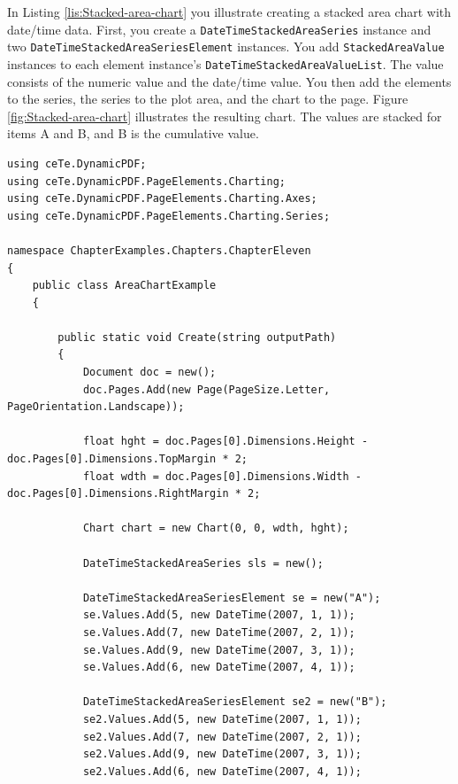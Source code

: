 \documentclass[american,letterpaper]{tufte-book}
\numberwithin{equation}{section}
\numberwithin{figure}{section}
\begin{document}
{In Listing \ref{lis:Stacked-area-chart} you illustrate creating a
stacked area chart with date/time data. First, you create a \texttt{DateTimeStackedAreaSeries}
instance and two \texttt{DateTimeStackedAreaSeriesElement} instances.
You add \texttt{StackedAreaValue} instances to each element instance’s
\texttt{DateTimeStackedAreaValueList}. The value consists of the numeric
value and the date/time value. You then add the elements to the series,
the series to the plot area, and the chart to the page. Figure \ref{fig:Stacked-area-chart}
illustrates the resulting chart. The values are stacked for items
A and B, and B is the cumulative value.

\bgroup{}
\begin{lstlisting}[caption={Stacked area chart with date/time data.},label={lis:Stacked-area-chart},basicstyle={\small\ttfamily},breaklines=true]
using ceTe.DynamicPDF;
using ceTe.DynamicPDF.PageElements.Charting;
using ceTe.DynamicPDF.PageElements.Charting.Axes;
using ceTe.DynamicPDF.PageElements.Charting.Series;

namespace ChapterExamples.Chapters.ChapterEleven
{
    public class AreaChartExample
    {

        public static void Create(string outputPath)
        {
            Document doc = new();
            doc.Pages.Add(new Page(PageSize.Letter, PageOrientation.Landscape));

            float hght = doc.Pages[0].Dimensions.Height - doc.Pages[0].Dimensions.TopMargin * 2;
            float wdth = doc.Pages[0].Dimensions.Width - doc.Pages[0].Dimensions.RightMargin * 2;

            Chart chart = new Chart(0, 0, wdth, hght);

            DateTimeStackedAreaSeries sls = new();

            DateTimeStackedAreaSeriesElement se = new("A");
            se.Values.Add(5, new DateTime(2007, 1, 1));
            se.Values.Add(7, new DateTime(2007, 2, 1));
            se.Values.Add(9, new DateTime(2007, 3, 1));
            se.Values.Add(6, new DateTime(2007, 4, 1));

            DateTimeStackedAreaSeriesElement se2 = new("B");
            se2.Values.Add(5, new DateTime(2007, 1, 1));
            se2.Values.Add(7, new DateTime(2007, 2, 1));
            se2.Values.Add(9, new DateTime(2007, 3, 1));
            se2.Values.Add(6, new DateTime(2007, 4, 1));


\end{lstlisting}}
\end{document}
